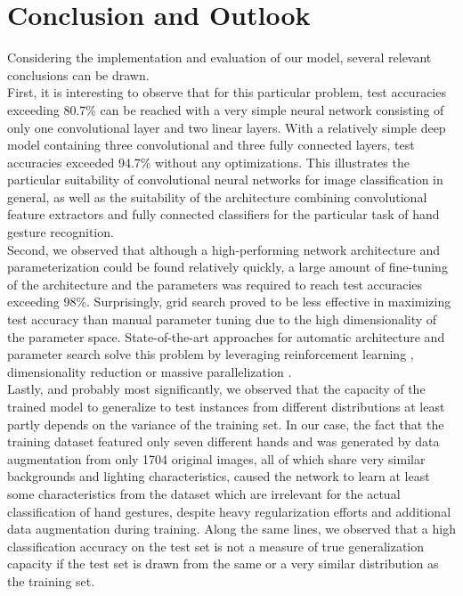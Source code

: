 \documentclass[a4paper]{article}
\begin{document}
\section{Conclusion and Outlook}
\label{ch:conclusion}
Considering the implementation and evaluation of our model, several relevant conclusions can be drawn.\\
First, it is interesting to observe that for this particular problem, test accuracies exceeding 80.7\% can be reached with a very simple neural network consisting of only one convolutional layer and two linear layers. With a relatively simple deep model containing three convolutional and three fully connected layers, test accuracies exceeded 94.7\% without any optimizations. This illustrates the particular suitability of convolutional neural networks for image classification in general, as well as the suitability of the architecture combining convolutional feature extractors and fully connected classifiers for the particular task of hand gesture recognition.\\
Second, we observed that although a high-performing network architecture and parameterization could be found relatively quickly, a large amount of fine-tuning of the architecture and the parameters was required to reach test accuracies exceeding 98\%. Surprisingly, grid search proved to be less effective in maximizing test accuracy than manual parameter tuning due to the high dimensionality of the parameter space. State-of-the-art approaches for automatic architecture and parameter search solve this problem by leveraging reinforcement learning \cite{Zoph2016}, dimensionality reduction \cite{Hinz2018} or massive parallelization \cite{Li2018}.\\
Lastly, and probably most significantly, we observed that the capacity of the trained model to generalize to test instances from different distributions at least partly depends on the variance of the training set. In our case, the fact that the training dataset featured only seven different hands and was generated by data augmentation from only 1704 original images, all of which share very similar backgrounds and lighting characteristics, caused the network to learn at least some characteristics from the dataset which are irrelevant for the actual classification of hand gestures, despite heavy regularization efforts and additional data augmentation during training. Along the same lines, we observed that a high classification accuracy on the test set is not a measure of true generalization capacity if the test set is drawn from the same or a very similar distribution as the training set.
\end{document}
